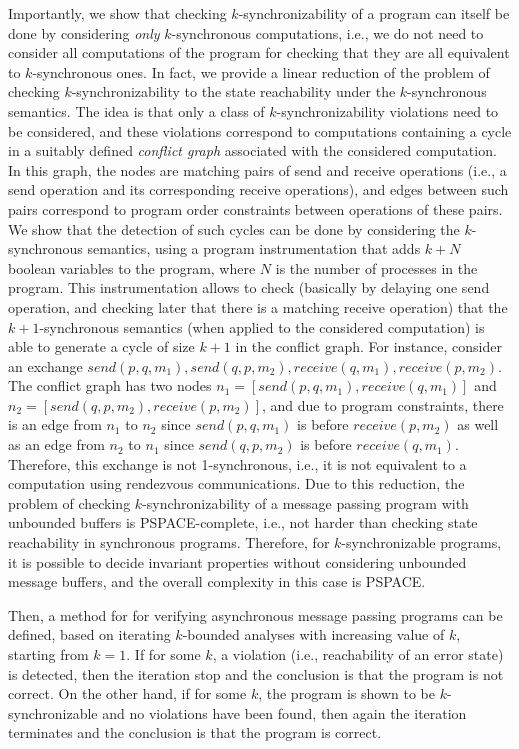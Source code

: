 Importantly, we show that checking $k$-synchronizability of a program can itself be done by considering {\em only} $k$-synchronous computations, i.e., we do not need to consider all computations of the program for checking that they are all equivalent to $k$-synchronous ones. In fact, we provide a linear reduction of the problem of checking $k$-synchronizability to the state reachability under the $k$-synchronous semantics. The idea is that only a class of $k$-synchronizability violations need to be considered, and these violations correspond to computations containing a cycle in a suitably defined {\em conflict graph} associated with the considered computation. In this graph, the nodes are matching pairs of send and receive operations (i.e., a send operation and its corresponding receive operations), and edges between such pairs correspond to program order constraints between operations of these pairs. We show that the detection of such cycles can be done by considering the $k$-synchronous semantics, using a program instrumentation that adds $k + N$ boolean variables to the program, where $N$ is the number of processes in the program. This instrumentation allows to check (basically by delaying one send operation, and checking later that there is a matching receive operation) that the $k+1$-synchronous semantics (when applied to the considered computation) is able to generate a cycle of size $k+1$ in the conflict graph. For instance, consider an exchange $send (p, q, m_1), send (q, p, m_2), receive (q, m_1), receive (p, m_2)$. The conflict graph has two nodes $n_1 = [ send(p, q, m_1), receive (q, m_1) ]$ and $n_2 = [ send(q, p, m_2), receive (p, m_2) ]$, and due to program constraints, there is an edge from $n_1$ to $n_2$ since $send(p, q, m_1)$ is before $receive (p, m_2)$ as well as an edge from $n_2$ to $n_1$ since $send(q, p, m_2)$ is before $receive (q, m_1)$. Therefore, this exchange is not 1-synchronous, i.e., it is not equivalent to a computation using rendezvous communications. 
Due to this reduction, the problem of checking $k$-synchronizability of a message passing program with unbounded buffers is PSPACE-complete, i.e., not harder than checking state reachability in synchronous programs. Therefore, for $k$-synchronizable programs, it is possible to decide invariant properties without considering unbounded message buffers, and the overall complexity in this case is PSPACE. 

Then, a method for for verifying asynchronous message passing programs can be defined, 
based on iterating $k$-bounded analyses with increasing value of $k$, starting from $k=1$. If for some $k$, a violation (i.e., reachability of an error state) is detected, then the iteration stop and the conclusion is that the program is not correct. On the other hand, if for some $k$, the program is shown to be $k$-synchronizable and no violations have been found, then again the iteration terminates and the conclusion is that the program is correct. 

